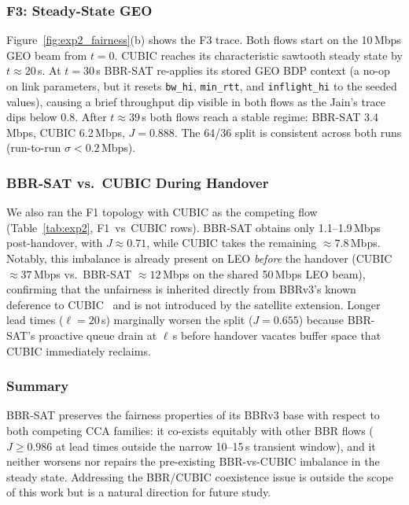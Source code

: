 \documentclass[conference]{IEEEtran}
\begin{document}
\subsubsection{F3: Steady-State GEO}

Figure~\ref{fig:exp2_fairness}(b) shows the F3 trace.
Both flows start on the 10\,Mbps GEO beam from $t = 0$.
CUBIC reaches its characteristic sawtooth steady state by $t \approx 20$\,s.
At $t = 30$\,s BBR-SAT re-applies its stored GEO BDP context
(a no-op on link parameters, but it resets \texttt{bw\_hi},
\texttt{min\_rtt}, and \texttt{inflight\_hi} to the seeded values),
causing a brief throughput dip visible in both flows as the Jain's trace
dips below 0.8.
After $t \approx 39$\,s both flows reach a stable regime:
BBR-SAT 3.4\,Mbps, CUBIC 6.2\,Mbps, $J = 0.888$.
The 64/36 split is consistent across both runs (run-to-run $\sigma < 0.2$\,Mbps).

\subsubsection{BBR-SAT vs.\ CUBIC During Handover}

We also ran the F1 topology with CUBIC as the competing flow
(Table~\ref{tab:exp2}, F1~vs~CUBIC rows).
BBR-SAT obtains only 1.1--1.9\,Mbps post-handover, with $J \approx 0.71$,
while CUBIC takes the remaining $\approx7.8$\,Mbps.
Notably, this imbalance is already present on LEO \emph{before} the
handover (CUBIC $\approx 37$\,Mbps vs.\ BBR-SAT $\approx 12$\,Mbps on
the shared 50\,Mbps LEO beam), confirming that the unfairness is
inherited directly from BBRv3's known deference to CUBIC~\cite{cardwell2017}
and is not introduced by the satellite extension.
Longer lead times ($\ell = 20$\,s) marginally worsen the split
($J = 0.655$) because BBR-SAT's proactive queue drain at $\ell$\,s before
handover vacates buffer space that CUBIC immediately reclaims.

\subsubsection{Summary}

BBR-SAT preserves the fairness properties of its BBRv3 base with
respect to both competing CCA families:
it co-exists equitably with other BBR flows ($J \geq 0.986$ at
lead times outside the narrow 10--15\,s transient window), and it
neither worsens nor repairs the pre-existing BBR-vs-CUBIC imbalance
in the steady state.
Addressing the BBR/CUBIC coexistence issue is outside the scope of
this work but is a natural direction for future study.
\end{document}
